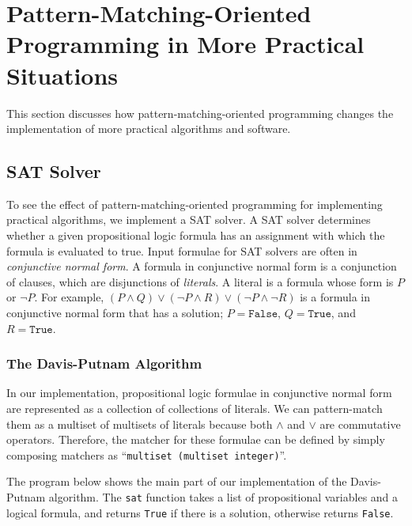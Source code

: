 \documentclass{article}
\begin{document}
\section{Pattern-Matching-Oriented Programming in More Practical Situations}\label{pmo2}

This section discusses how pattern-matching-oriented programming changes the implementation of more practical algorithms and software.


\subsection{SAT Solver}\label{sat-solver}

To see the effect of pattern-matching-oriented programming for implementing practical algorithms, we implement a SAT solver.
A SAT solver determines whether a given propositional logic formula has an assignment with which the formula is evaluated to true.
Input formulae for SAT solvers are often in \emph{conjunctive normal form}.
A formula in conjunctive normal form is a conjunction of clauses, which are disjunctions of \emph{literals}.
A literal is a formula whose form is $P$ or $\neg P$.
For example, $(P \wedge Q) \lor (\neg P \wedge R) \lor (\neg P \wedge \neg R)$ is a formula in conjunctive normal form that has a solution; $P = \texttt{False}$, $Q = \texttt{True}$, and $R = \texttt{True}$.

\subsubsection{The Davis-Putnam Algorithm}

In our implementation, propositional logic formulae in conjunctive normal form are represented as a collection of collections of literals.
We can pattern-match them as a multiset of multisets of literals because both $\wedge$ and $\lor$ are commutative operators.
Therefore, the matcher for these formulae can be defined by simply composing matchers as ``\texttt{multiset (multiset integer)}''.

The program below shows the main part of our implementation of the Davis-Putnam algorithm\cite{harrison2009handbook}.
The \texttt{sat} function takes a list of propositional variables and a logical formula, and returns \texttt{True} if there is a solution, otherwise returns \texttt{False}.
\end{document}
